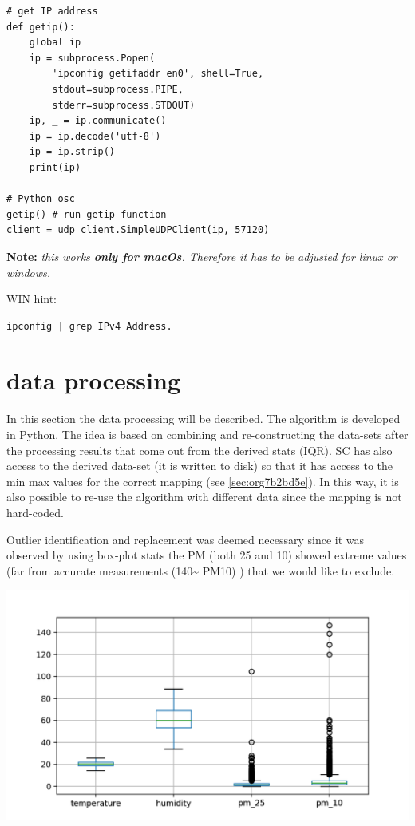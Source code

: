 \documentclass[11pt]{article}
\begin{document}
\begin{verbatim}
# get IP address
def getip():
    global ip
    ip = subprocess.Popen(
        'ipconfig getifaddr en0', shell=True,
        stdout=subprocess.PIPE,
        stderr=subprocess.STDOUT)
    ip, _ = ip.communicate()
    ip = ip.decode('utf-8')
    ip = ip.strip()
    print(ip)

# Python osc
getip() # run getip function
client = udp_client.SimpleUDPClient(ip, 57120)
\end{verbatim}
\textbf{Note:} \emph{this works \textbf{only for macOs}.  Therefore it has to be adjusted for linux or windows.}

\vspace{0.2cm}
\noindent
WIN hint:
\begin{verbatim}
ipconfig | grep IPv4 Address.
\end{verbatim}

\section{data processing}
\label{sec:org3b24617}
In this section the data processing will be described.  The algorithm is developed in Python.  The idea is based on combining and re-constructing the data-sets after the processing results that come out from the derived stats (IQR).  SC has also access to the derived data-set (it is written to disk) so that it has access to the min max values for the correct mapping (see \ref{sec:org7b2bd5e}).  In this way, it is also possible to re-use the algorithm with different data since the mapping is not hard-coded.

Outlier identification and replacement was deemed necessary since it was observed by using box-plot stats the PM (both 25 and 10) showed extreme values (far from accurate measurements (140\textasciitilde{} PM10) ) that we would like to exclude.

\begin{center}
\includegraphics[width=.9\linewidth]{./boxplot.png}
\end{center}
\end{document}
